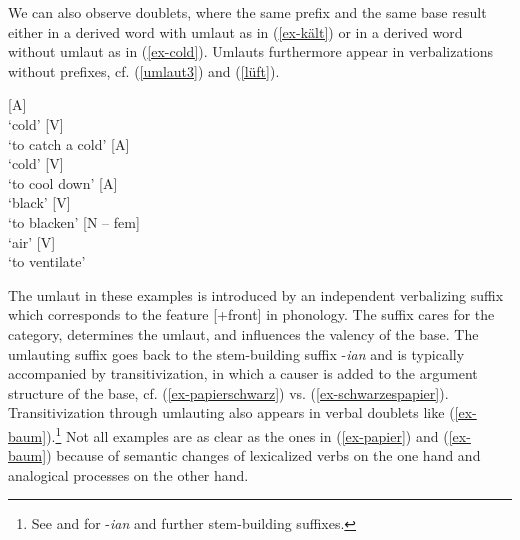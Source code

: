 \documentclass[output=paper
  ,nobabel
  ,draftmode
  ,colorlinks, citecolor=brown
]{langscibook}
\begin{document}
\noindent We can also observe doublets, where the same prefix and the same base result either in a derived word with umlaut as in (\ref{ex-kält}) or in a derived word without umlaut as in (\ref{ex-cold}). Umlauts furthermore appear in verbalizations without prefixes, cf. (\ref{umlaut3}) and (\ref{lüft}).

\begin{exe}
\ex
  \begin{xlist}
\label{ex-kält}
\ex {} {}[A{}]\\`cold'
\ex {} {}[V{}]\\`to catch a cold'
\zl
\eal
\label{ex-cold}
\ex {} {}[A{}]\\`cold'
\ex {} {}[V{}]\\`to cool down' 
\zl
\eal
\label{umlaut3}
\ex\label{schwärz} {}[A{}]\\`black'
\ex {} {}[V{}]\\`to blacken'
\zl
\eal
\label{lüft}
\ex{} {}[N -- fem{}]\\`air'
\ex{} {}[V{}]\\`to ventilate'
\end{xlist}
\end{exe}


\noindent 
The umlaut in these examples is introduced by an independent verbalizing suffix which corresponds to the feature [+front] in phonology. The suffix cares for the category, determines the umlaut, and influences the valency of the base. The umlauting suffix goes back to the  stem-building suffix -\emph{ian} and is typically accompanied by transitivization, in which a causer is added to the argument structure of the base, cf. (\ref{ex-papierschwarz}) vs. (\ref{ex-schwarzespapier}). Transitivization through umlauting also appears in verbal doublets like (\ref{ex-baum}).\footnote{See \textcites[90--93]{Sonderegger1997}[Section~5.3.7]{Sonderegger2003} and  for -\emph{ian} and further  stem-building suffixes.} Not all examples are as clear as the ones in (\ref{ex-papier}) and (\ref{ex-baum}) because of semantic changes of lexicalized verbs on the one hand and analogical processes on the other hand.
\end{document}

